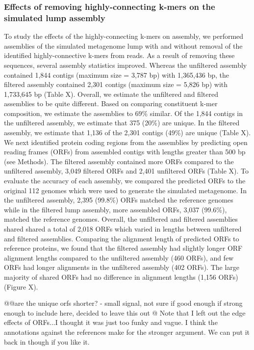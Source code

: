 \documentclass[11pt]{article} %
\begin{document}
\subsubsection{Effects of removing highly-connecting k-mers on the simulated lump assembly}
To study the effects of the highly-connecting k-mers on assembly, we performed assemblies of the simulated metagenome lump with and without removal of the identified highly-connective k-mers from reads.  As a result of removing these sequences, several assembly statistics improved.  Whereas the unfiltered assembly contained 1,844 contigs (maximum size = 3,787 bp) with 1,365,436 bp, the filtered assembly contained 2,301 contigs (maximum size = 5,826 bp) with 1,733,645 bp (Table X).  Overall, we estimate the unfiltered and filtered assemblies to be quite different.  Based on comparing constituent k-mer composition, we estimate the assemblies to 69\% similar.  Of the 1,844 contigs in the unfiltered assembly, we estimate that 375 (20\%) are unique.  In the filtered assembly, we estimate that 1,136 of the 2,301 contigs (49\%) are unique (Table X). 
	We next identified protein coding regions from the assemblies by predicting open reading frames (ORFs) from assembled contigs with lengths greater than 500 bp (see Methods).  The filtered assembly contained more ORFs compared to the unfiltered assembly, 3,049 filtered ORFs and 2,401 unfiltered ORFs (Table X).  To evaluate the accuracy of each assembly, we compared the predicted ORFs to the original 112 genomes which were used to generate the simulated metagenome.  In the unfiltered assembly, 2,395 (99.8\%) ORFs matched the reference genomes while in the filtered lump assembly, more assembled ORFs, 3,037 (99.6\%), matched the reference genomes.  Overall, the unfiltered and filtered assemblies shared shared a total of 2,018 ORFs which varied in lengths between unfiltered and filtered assemblies.  Comparing the alignment length of predicted ORFs to reference proteins, we found that the filtered assembly had slightly longer ORF alignment lengths compared to the unfiltered assembly (460 ORFs), and few ORFs had longer alignments in the unfiltered assembly (402 ORFs).  The large majority of shared ORFs had no difference in alignment lengths (1,156 ORFs) (Figure X).  

@@are the unique orfs shorter? - small signal, not sure if good enough if strong enough to include here, decided to leave this out
@ Note that I left out the edge effects of ORFs...I thought it was just too funky and vague.  I think the annotations against the references make for the stronger argument.  We can put it back in though if you like it.
\end{document}

